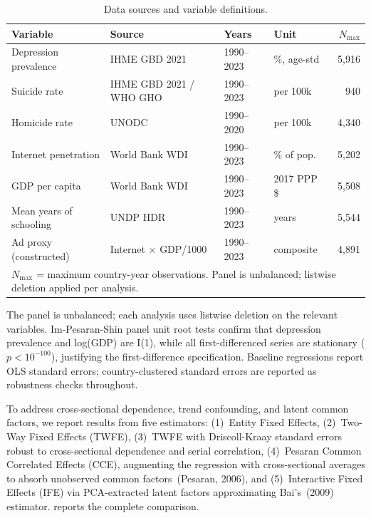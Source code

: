 \documentclass[a4paper,11pt,titlepage]{article}
\begin{document}
\begin{table}[htbp]
\centering
\caption{Data sources and variable definitions.}
\label{tab:data-sources}
\small
\begin{tabular}{llllr}
\toprule
Variable & Source & Years & Unit & $N_{\max}$ \\
\midrule
Depression prevalence & IHME GBD 2021 & 1990--2023 & \%, age-std & 5,916 \\
Suicide rate & IHME GBD 2021 / WHO GHO & 1990--2023 & per 100k & 940 \\
Homicide rate & UNODC & 1990--2020 & per 100k & 4,340 \\
Internet penetration & World Bank WDI & 1990--2023 & \% of pop. & 5,202 \\
GDP per capita & World Bank WDI & 1990--2023 & 2017 PPP \$ & 5,508 \\
Mean years of schooling & UNDP HDR & 1990--2023 & years & 5,544 \\
Ad proxy (constructed) & Internet $\times$ GDP/1000 & 1990--2023 & composite & 4,891 \\
\bottomrule
\multicolumn{5}{l}{\scriptsize $N_{\max}$ = maximum country-year observations. Panel is unbalanced; listwise deletion applied per analysis.}
\end{tabular}
\end{table}

The panel is unbalanced; each analysis uses listwise deletion on the relevant variables. Im-Pesaran-Shin panel unit root tests confirm that depression prevalence and log(GDP) are I(1), while all first-differenced series are stationary ($p < 10^{-100}$), justifying the first-difference specification. Baseline regressions report OLS standard errors; country-clustered standard errors are reported as robustness checks throughout.

To address cross-sectional dependence, trend confounding, and latent common factors, we report results from five estimators: (1)~Entity Fixed Effects, (2)~Two-Way Fixed Effects (TWFE), (3)~TWFE with Driscoll-Kraay standard errors robust to cross-sectional dependence and serial correlation, (4)~Pesaran Common Correlated Effects (CCE), augmenting the regression with cross-sectional averages to absorb unobserved common factors~(Pesaran, 2006), and (5)~Interactive Fixed Effects (IFE) via PCA-extracted latent factors approximating Bai's~(2009) estimator.  reports the complete comparison.
\end{document}
